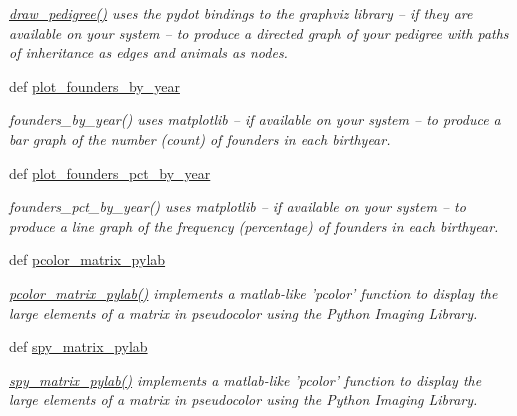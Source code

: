 \begin{CompactItemize}
\begin{CompactList}\small\item\em \hyperlink{namespacePyPedal_1_1pyp__graphics_60eaf4bd218e2b1f32385ce9e6b8e066}{draw\_\-pedigree()} uses the pydot bindings to the graphviz library -- if they are available on your system -- to produce a directed graph of your pedigree with paths of inheritance as edges and animals as nodes. \item\end{CompactList}\item 
def \hyperlink{namespacePyPedal_1_1pyp__graphics_3795b92107fa37e5416ed51e4decadb9}{plot\_\-founders\_\-by\_\-year}
\begin{CompactList}\small\item\em founders\_\-by\_\-year() uses matplotlib -- if available on your system -- to produce a bar graph of the number (count) of founders in each birthyear. \item\end{CompactList}\item 
def \hyperlink{namespacePyPedal_1_1pyp__graphics_48dcfef58e6a02924d822a5f8b9e69de}{plot\_\-founders\_\-pct\_\-by\_\-year}
\begin{CompactList}\small\item\em founders\_\-pct\_\-by\_\-year() uses matplotlib -- if available on your system -- to produce a line graph of the frequency (percentage) of founders in each birthyear. \item\end{CompactList}\item 
def \hyperlink{namespacePyPedal_1_1pyp__graphics_e02ac5f823a1ef850391ad396638ac7b}{pcolor\_\-matrix\_\-pylab}
\begin{CompactList}\small\item\em \hyperlink{namespacePyPedal_1_1pyp__graphics_e02ac5f823a1ef850391ad396638ac7b}{pcolor\_\-matrix\_\-pylab()} implements a matlab-like 'pcolor' function to display the large elements of a matrix in pseudocolor using the Python Imaging Library. \item\end{CompactList}\item 
def \hyperlink{namespacePyPedal_1_1pyp__graphics_9ac93feea0e4389e3d1e08798fe5e105}{spy\_\-matrix\_\-pylab}
\begin{CompactList}\small\item\em \hyperlink{namespacePyPedal_1_1pyp__graphics_9ac93feea0e4389e3d1e08798fe5e105}{spy\_\-matrix\_\-pylab()} implements a matlab-like 'pcolor' function to display the large elements of a matrix in pseudocolor using the Python Imaging Library. \item\end{CompactList}\item 

\end{CompactItemize}
